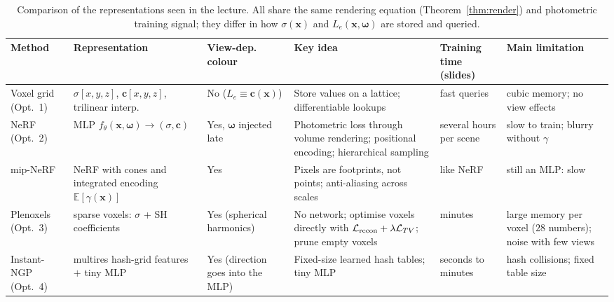 \documentclass[11pt,a4paper]{article}
\newcommand{\E}{\mathbb{E}}
\newcommand{\xx}{\boldsymbol{x}}
\newcommand{\om}{\boldsymbol{\omega}}
\newcommand{\cc}{\boldsymbol{c}}
\newcommand{\Le}{L_e}
\theoremstyle{definition}
\theoremstyle{plain}
\begin{document}
\begin{table}[htbp]
\centering
\footnotesize
\setlength{\tabcolsep}{3pt}
\renewcommand{\arraystretch}{1.25}
\begin{tabular}{@{}>{\raggedright\arraybackslash}p{1.9cm}>{\raggedright\arraybackslash}p{2.9cm}>{\raggedright\arraybackslash}p{2.0cm}>{\raggedright\arraybackslash}p{3.3cm}>{\raggedright\arraybackslash}p{2.0cm}>{\raggedright\arraybackslash}p{2.7cm}@{}}
\toprule
\textbf{Method} & \textbf{Representation} & \textbf{View-dep. colour} & \textbf{Key idea} & \textbf{Training time (slides)} & \textbf{Main limitation}\\
\midrule
Voxel grid (Opt.~1) & $\sigma[x,y,z]$, $\cc[x,y,z]$, trilinear interp. & No ($\Le\equiv\cc(\xx)$) & Store values on a lattice; differentiable lookups & fast queries & cubic memory; no view effects\\
\addlinespace
NeRF (Opt.~2) & MLP $f_\theta(\xx,\om)\to(\sigma,\cc)$ & Yes, $\om$ injected late & Photometric loss through volume rendering; positional encoding; hierarchical sampling & several hours per scene & slow to train; blurry without $\gamma$\\
\addlinespace
mip-NeRF & NeRF with cones and integrated encoding $\E[\gamma(\xx)]$ & Yes & Pixels are footprints, not points; anti-aliasing across scales & like NeRF & still an MLP: slow\\
\addlinespace
Plenoxels (Opt.~3) & sparse voxels: $\sigma$ + SH coefficients & Yes (spherical harmonics) & No network; optimise voxels directly with $\mathcal L_{\rm recon}+\lambda\mathcal L_{TV}$; prune empty voxels & minutes & large memory per voxel ($28$ numbers); noise with few views\\
\addlinespace
Instant-NGP (Opt.~4) & multires hash-grid features $+$ tiny MLP & Yes (direction goes into the MLP) & Fixed-size learned hash tables; tiny MLP & seconds to minutes & hash collisions; fixed table size\\
\bottomrule
\end{tabular}
\caption{Comparison of the representations seen in the lecture. All share the same rendering equation (Theorem~\ref{thm:render}) and photometric training signal; they differ in how $\sigma(\xx)$ and $\Le(\xx,\om)$ are stored and queried.}
\end{table}
\end{document}
